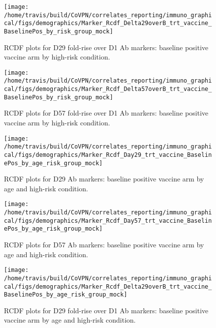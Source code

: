 \documentclass[]{book}
\theoremstyle{definition}
\theoremstyle{definition}
\theoremstyle{definition}
\newcommand{\1}{\mathbbm{1}}
\begin{document}
\begin{figure}[H]

{\centering \texttt{[image: /home/travis/build/CoVPN/correlates\_reporting/immuno\_graphical/figs/demographics/Marker\_Rcdf\_Delta29overB\_trt\_vaccine\_BaselinePos\_by\_risk\_group\_mock]} 

}

\caption{RCDF plots for D29 fold-rise over D1 Ab markers: baseline positive vaccine arm by high-risk condition.}\label{fig:unnamed-chunk-98}
\end{figure}

\begin{figure}[H]

{\centering \texttt{[image: /home/travis/build/CoVPN/correlates\_reporting/immuno\_graphical/figs/demographics/Marker\_Rcdf\_Delta57overB\_trt\_vaccine\_BaselinePos\_by\_risk\_group\_mock]} 

}

\caption{RCDF plots for D57 fold-rise over D1 Ab markers: baseline positive vaccine arm by high-risk condition.}\label{fig:unnamed-chunk-99}
\end{figure}

\begin{figure}[H]

{\centering \texttt{[image: /home/travis/build/CoVPN/correlates\_reporting/immuno\_graphical/figs/demographics/Marker\_Rcdf\_Day29\_trt\_vaccine\_BaselinePos\_by\_age\_risk\_group\_mock]} 

}

\caption{RCDF plots for D29 Ab markers: baseline positive vaccine arm by age and high-risk condition.}\label{fig:unnamed-chunk-100}
\end{figure}

\begin{figure}[H]

{\centering \texttt{[image: /home/travis/build/CoVPN/correlates\_reporting/immuno\_graphical/figs/demographics/Marker\_Rcdf\_Day57\_trt\_vaccine\_BaselinePos\_by\_age\_risk\_group\_mock]} 

}

\caption{RCDF plots for D57 Ab markers: baseline positive vaccine arm by age and high-risk condition.}\label{fig:unnamed-chunk-101}
\end{figure}

\begin{figure}[H]

{\centering \texttt{[image: /home/travis/build/CoVPN/correlates\_reporting/immuno\_graphical/figs/demographics/Marker\_Rcdf\_Delta29overB\_trt\_vaccine\_BaselinePos\_by\_age\_risk\_group\_mock]} 

}

\caption{RCDF plots for D29 fold-rise over D1 Ab markers: baseline positive vaccine arm by age and high-risk condition.}\label{fig:unnamed-chunk-102}
\end{figure}
\end{document}

